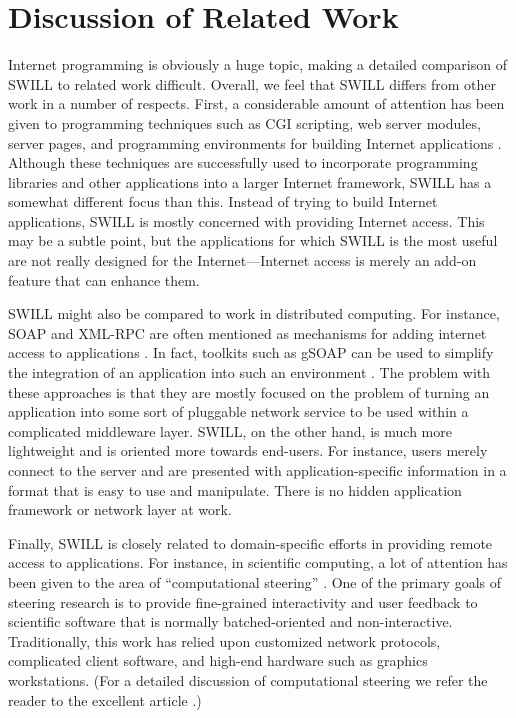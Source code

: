 \section{Discussion of Related Work}

Internet programming is obviously a huge topic, making a detailed
comparison of SWILL to related work difficult.  Overall, we feel that
SWILL differs from other work in a number of respects.  First, a
considerable amount of attention has been given to programming
techniques such as CGI scripting, web server modules, server pages, 
and programming environments for building Internet applications
\cite{cgi,apache, csp, hsp, zope}.  Although these techniques are successfully
used to incorporate programming libraries and other applications into
a larger Internet framework, SWILL has a somewhat different focus than
this. Instead of trying to build Internet applications, SWILL is
mostly concerned with providing Internet access. This may be a subtle
point, but the applications for which SWILL is the most useful are not really
designed for the Internet---Internet access is merely an add-on feature that
can enhance them. 

SWILL might also be compared to work in distributed
computing.  For instance, SOAP and XML-RPC are often mentioned as
mechanisms for adding internet access to applications \cite{soap,xmlrpc}.
In fact, toolkits such as gSOAP can be used to simplify the
integration of an application into such an environment \cite{gsoap}.
The problem with these approaches is that they are mostly focused on
the problem of turning an application into some sort of pluggable
network service to be used within a complicated middleware layer.  SWILL,
on the other hand, is much more lightweight and is oriented more towards
end-users.  For instance, users merely connect to the server and
are presented with application-specific information in a format that is
easy to use and manipulate.   There is no hidden application framework
or network layer at work.

Finally, SWILL is closely related to domain-specific efforts in
providing remote access to applications.  For instance, in scientific
computing, a lot of attention has been given to the area of
``computational steering'' \cite{vetter2}.  
One of the primary goals
of steering research is to provide fine-grained interactivity and user
feedback to scientific software that is normally
batched-oriented and non-interactive.  Traditionally, this work has
relied upon customized network protocols, complicated client
software, and high-end hardware such as graphics workstations.
(For a detailed discussion of computational steering we refer the reader to the excellent article \cite{vetter}.)

